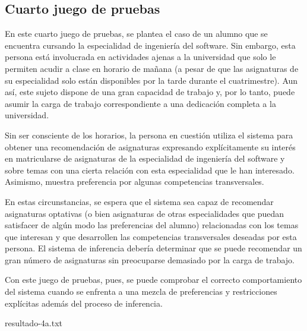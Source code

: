 
\subsection{Cuarto juego de pruebas} \label{sec:prueba-4}

En este cuarto juego de pruebas, se plantea el caso de un alumno que se 
encuentra cursando la especialidad de ingeniería del software. Sin embargo, 
esta persona está involucrada en actividades ajenas a la universidad que solo 
le permiten acudir a clase en horario de mañana (a pesar de que las 
asignaturas de su especialidad solo están disponibles por la tarde durante el 
cuatrimestre). Aun así, este sujeto dispone de una gran capacidad de trabajo 
y, por lo tanto, puede asumir la carga de trabajo correspondiente a una 
dedicación completa a la universidad.

Sin ser consciente de los horarios, la persona en cuestión utiliza el sistema 
para obtener una recomendación de asignaturas expresando explícitamente su 
interés en matricularse de asignaturas de la especialidad de ingeniería del 
software y sobre temas con una cierta relación con esta especialidad que le 
han interesado. Asimismo, muestra preferencia por algunas competencias 
transversales.

En estas circunstancias, se espera que el sistema sea capaz de recomendar 
asignaturas optativas (o bien asignaturas de otras especialidades que puedan 
satisfacer de algún modo las preferencias del alumno) relacionadas con los 
temas que interesan y que desarrollen las competencias transversales deseadas 
por esta persona. El sistema de inferencia debería determinar que se puede 
recomendar un gran número de asignaturas sin preocuparse demasiado por la 
carga de trabajo.

Con este juego de pruebas, pues, se puede comprobar el correcto 
comportamiento del sistema cuando se enfrenta a una mezcla de preferencias y 
restricciones explícitas además del proceso de inferencia.

%
    {resultado-4a.txt}

